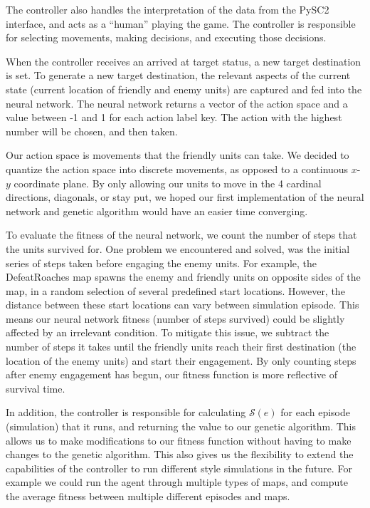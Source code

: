 \documentclass{article}
\begin{document}
The controller also handles the interpretation of the data from the PySC2
interface, and acts as a ``human'' playing the game. The controller is
responsible for selecting movements, making decisions, and executing those
decisions.

When the controller receives an arrived at target status, a new
target destination is set.  To generate a new target destination, the relevant
aspects of the current state (current location of friendly and enemy units) are
captured and fed into the neural network.  The neural network returns a
vector of the action space and a value between -1 and 1 for each
action label key. The action with the highest number will be chosen, and then
taken.

Our action space is movements that the friendly units can take. We decided to
quantize the action space into discrete movements, as opposed to a continuous
$x$-$y$ coordinate plane. By only allowing our units to move in the 4 cardinal
directions, diagonals, or stay put, we hoped our first implementation of the
neural network and genetic algorithm would have an easier time converging. 

To evaluate the fitness of the neural network, we count the number of steps that
the units survived for.  One problem we encountered and solved, was the initial
series of steps taken before engaging the enemy units. For example, the
DefeatRoaches map spawns the enemy and friendly units on opposite sides of the
map, in a random selection of several predefined start locations.  However, the
distance between these start locations can vary between simulation episode.
This means our neural network fitness (number of steps survived) could be
slightly affected by an irrelevant condition.  To mitigate this issue, we
subtract the number of steps it takes until the friendly units reach their first
destination (the location of the enemy units) and start their engagement. By
only counting steps after enemy engagement has begun, our fitness function is
more reflective of survival time.

In addition, the controller is responsible for calculating $\mathcal{S}(e)$ for
each episode (simulation) that it runs, and returning the value to our genetic
algorithm. This allows us to make modifications to our fitness function without
having to make changes to the genetic algorithm. This also gives us the
flexibility to extend the capabilities of the controller to run different style
simulations in the future. For example we could run the agent through multiple
types of maps, and compute the average fitness between multiple different
episodes and maps.
\end{document}
